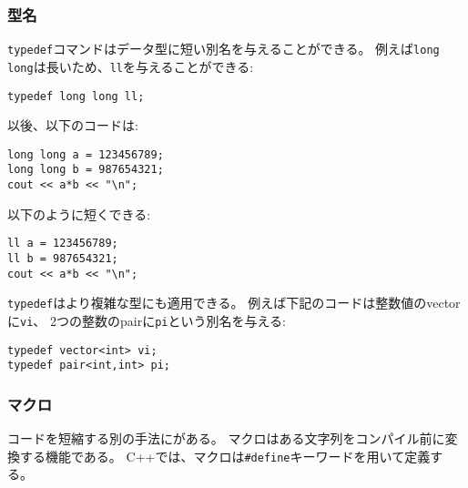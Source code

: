 \subsubsection{型名}

\texttt{typedef}コマンドはデータ型に短い別名を与えることができる。
例えば\texttt{long long}は長いため、\texttt{ll}を与えることができる:
\begin{lstlisting}
typedef long long ll;
\end{lstlisting}

以後、以下のコードは:
\begin{lstlisting}
long long a = 123456789;
long long b = 987654321;
cout << a*b << "\n";
\end{lstlisting}

以下のように短くできる:
\begin{lstlisting}
ll a = 123456789;
ll b = 987654321;
cout << a*b << "\n";
\end{lstlisting}

\begin{comment}
The command \texttt{typedef}
can also be used with more complex types.
For example, the following code gives
the name \texttt{vi} for a vector of integers
and the name \texttt{pi} for a pair
that contains two integers.
\end{comment}

\texttt{typedef}はより複雑な型にも適用できる。
例えば下記のコードは整数値のvectorに\texttt{vi}、
2つの整数のpairに\texttt{pi}という別名を与える:

\begin{lstlisting}
typedef vector<int> vi;
typedef pair<int,int> pi;
\end{lstlisting}

\begin{comment}
\subsubsection{Macros}
\index{macro}
Another way to shorten code is to define
\key{macros}.
A macro means that certain strings in
the code will be changed before the compilation.
In C++, macros are defined using the
\texttt{\#define} keyword.
\end{comment}

\subsubsection{マクロ}
コードを短縮する別の手法にがある。
マクロはある文字列をコンパイル前に変換する機能である。
C++では、マクロは\texttt{\#define}キーワードを用いて定義する。


